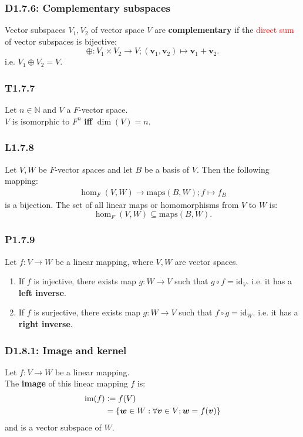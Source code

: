 \documentclass{article}
\newcommand{\deq}{\vcentcolon=}
\newcommand{\vc}[1]{\boldsymbol{#1}}
\begin{document}
\begin{multicols*}{3}
\subsubsection*{D1.7.6: Complementary subspaces}
Vector subspaces $V_1,V_2$ of vector space $V$
are \textbf{complementary} if the \textcolor{red}{direct sum}
of vector subspaces is bijective:
$$\oplus:V_1\times V_2\rightarrow V;
(\vc{v}_1,\vc{v}_2)\mapsto\vc{v}_1+\vc{v}_2.$$
i.e. $V_1\oplus V_2=V$.

\subsubsection*{T1.7.7}
Let $n\in\mathbb{N}$ and $V$ a $F$-vector space. \\
$V$ is isomorphic to $F^n$
\textbf{if{}f} $\dim(V)=n$.

\subsubsection*{L1.7.8}
Let $V,W$ be $F$-vector spaces and let $B$
be a basis of $V$. Then the following mapping:
\begin{align*}
    \hom_F(V,W)\rightarrow\text{maps}(B,W);
    f\mapsto f_B
\end{align*}
is a bijection.
The set of all linear maps or
homomorphisms from $V$ to $W$ is:
$$\hom_F(V,W)\subseteq\text{maps}(B,W).$$

\subsubsection*{P1.7.9}
Let $f:V\rightarrow W$ be a linear mapping,
where $V,W$ are vector spaces.
\begin{enumerate}
    \item If $f$ is injective, there exists map
    $g:W\rightarrow V$ such that $g\circ f=\text{id}_V$.
    i.e. it has a \textbf{left inverse}.
    
    \item If $f$ is surjective, there exists map
    $g:W\rightarrow V$ such that $f\circ g=\text{id}_W$.
    i.e. it has a \textbf{right inverse}.
\end{enumerate}

\subsubsection*{D1.8.1: Image and kernel}
Let $f:V\rightarrow W$ be a linear mapping. \\
The \textbf{image} of this linear mapping $f$ is:
\begin{align*}
    \text{im}(f)&\deq f(V) \\
    &=\{\vc{w}\in W:
    \forall\vc{v}\in V;\vc{w}=f(\vc{v})\}
\end{align*}
and is a vector subspace of $W$.


\end{multicols*}
\end{document}
